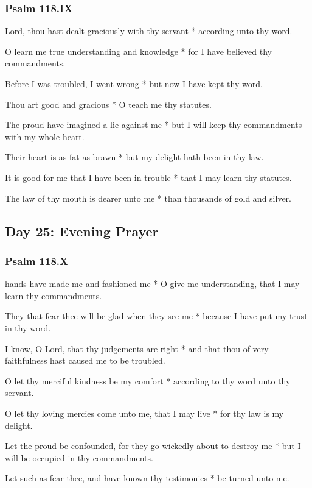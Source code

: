 \subsubsection{Psalm 118.IX}

 Lord, thou hast dealt graciously with thy servant * according unto thy word.

O learn me true understanding and knowledge * for I have believed thy commandments.

Before I was troubled, I went wrong * but now I have kept thy word.

Thou art good and gracious * O teach me thy statutes.

The proud have imagined a lie against me * but I will keep thy commandments with my whole heart.

Their heart is as fat as brawn * but my delight hath been in thy law.

It is good for me that I have been in trouble * that I may learn thy statutes.

The law of thy mouth is dearer unto me * than thousands of gold and silver.

\subsection{Day 25: Evening Prayer}

\subsubsection{Psalm 118.X}

 hands have made me and fashioned me * O give me understanding, that I may learn thy commandments.

They that fear thee will be glad when they see me * because I have put my trust in thy word.

I know, O Lord, that thy judgements are right * and that thou of very faithfulness hast caused me to be troubled.

O let thy merciful kindness be my comfort * according to thy word unto thy servant.

O let thy loving mercies come unto me, that I may live * for thy law is my delight.

Let the proud be confounded, for they go wickedly about to destroy me * but I will be occupied in thy commandments.

Let such as fear thee, and have known thy testimonies * be turned unto me.

